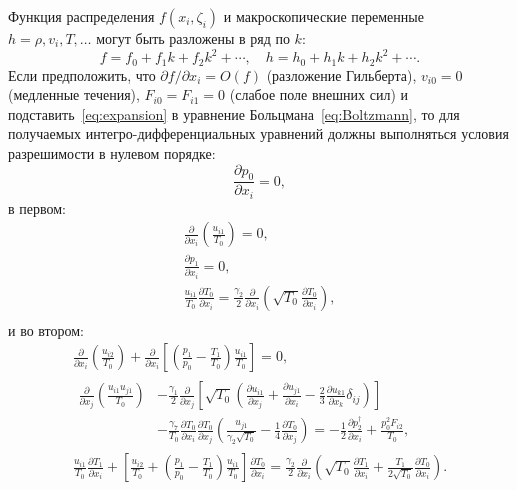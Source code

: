\documentclass[10pt]{article}
\newcommand{\pder}[2][]{\frac{\partial#1}{\partial#2}}
\newcommand{\Pder}[2][]{\partial#1/\partial#2}
\newcommand{\OO}[1]{O(#1)}
\begin{document}
Функция распределения \(f(x_i,\zeta_i)\) и макроскопические переменные \(h = \rho, v_i, T, \dots\)
могут быть разложены в ряд по \(k\):
\begin{equation}\label{eq:expansion}
    f = f_0 + f_1k + f_2k^2 + \cdots, \quad h = h_0 + h_1k + h_2k^2 + \cdots.
\end{equation}
Если предположить, что \(\Pder[f]{x_i} = \OO{f}\) (разложение Гильберта),
\(v_{i0} = 0\) (медленные течения), \(F_{i0} = F_{i1} = 0\) (слабое поле внешних сил)
и подставить~\eqref{eq:expansion} в уравнение Больцмана~\eqref{eq:Boltzmann},
то для получаемых интегро-дифференциальных уравнений должны выполняться
условия разрешимости в нулевом порядке:
\begin{equation}
    \pder[p_0]{x_i} = 0, \label{eq:asymptotic0_p}
\end{equation}
в первом:
\begin{gather}
    \pder{x_i}\left(\frac{u_{i1}}{T_0}\right) = 0, \label{eq:asymptotic1_u} \\
    \pder[p_1]{x_i} = 0, \label{eq:asymptotic1_p} \\
    \frac{u_{i1}}{T_0}\pder[T_0]{x_i}
        = \frac{\gamma_2}2\pder{x_i}\left(\sqrt{T_0}\pder[T_0]{x_i}\right), \label{eq:asymptotic1_T} \\
\end{gather}
и во втором:
\begin{gather}
    \pder{x_i}\left(\frac{u_{i2}}{T_0}\right)
        + \pder{x_i}\left[\left(\frac{p_1}{p_0}-\frac{T_1}{T_0}\right)\frac{u_{i1}}{T_0}\right] = 0, \label{eq:asymptotic2_u} \\
    \begin{aligned}
    \pder{x_j}\left(\frac{u_{i1}u_{j1}}{T_0}\right)
        &-\frac{\gamma_1}2\pder{x_j}\left[\sqrt{T_0}\left(
            \pder[u_{i1}]{x_j} + \pder[u_{j1}]{x_i} - \frac23\pder[u_{k1}]{x_k}\delta_{ij}
        \right)\right] \\
        &- \frac{\gamma_7}{T_0}\pder[T_0]{x_i}\pder[T_0]{x_j}\left(\frac{u_{j1}}{\gamma_2\sqrt{T_0}} - \frac{1}4\pder[T_0]{x_j}\right)
        = -\frac12\pder[p_2^\dag]{x_i} + \frac{p_0^2 F_{i2}}{T_0},
    \end{aligned} \label{eq:asymptotic2_p} \\
    \frac{u_{i1}}{T_0}\pder[T_1]{x_i}
        + \left[\frac{u_{i2}}{T_0} + \left(\frac{p_1}{p_0}-\frac{T_1}{T_0}\right)\frac{u_{i1}}{T_0}\right]\pder[T_0]{x_i}
        = \frac{\gamma_2}2\pder{x_i}\left(\sqrt{T_0}\pder[T_1]{x_i} + \frac{T_1}{2\sqrt{T_0}}\pder[T_0]{x_i}\right). \label{eq:asymptotic2_T}
\end{gather}
\end{document}

